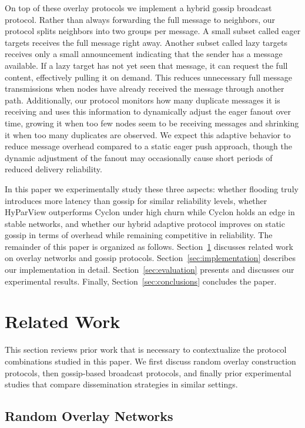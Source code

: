 \documentclass[sigconf,a4paper]{acmart}
\begin{document}
On top of these overlay protocols we implement a hybrid gossip broadcast
protocol. Rather than always forwarding the full message to neighbors, our
protocol splits neighbors into two groups per message. A small subset called
eager targets receives the full message right away. Another subset called
lazy targets receives only a small announcement indicating that the sender
has a message available. If a lazy target has not yet seen that message, it
can request the full content, effectively pulling it on demand. This reduces
unnecessary full message transmissions when nodes have already received the
message through another path. Additionally, our protocol monitors how many
duplicate messages it is receiving and uses this information to dynamically
adjust the eager fanout over time, growing it when too few nodes seem to be
receiving messages and shrinking it when too many duplicates are observed.
We expect this adaptive behavior to reduce message overhead compared to a
static eager push approach, though the dynamic adjustment of the fanout may
occasionally cause short periods of reduced delivery reliability.

In this paper we experimentally study these three aspects: whether flooding
truly introduces more latency than gossip for similar reliability levels,
whether HyParView outperforms Cyclon under high churn while Cyclon holds
an edge in stable networks, and whether our hybrid adaptive protocol
improves on static gossip in terms of overhead while remaining competitive
in reliability. The remainder of this paper is organized as follows.
Section~\ref{sec:related} discusses related work on overlay networks and
gossip protocols. Section~\ref{sec:implementation} describes our
implementation in detail. Section~\ref{sec:evaluation} presents and
discusses our experimental results. Finally,
Section~\ref{sec:conclusions} concludes the paper.

\section{Related Work}
\label{sec:related}

This section reviews prior work that is necessary to contextualize the
protocol combinations studied in this paper. We first discuss random
overlay construction protocols, then gossip-based broadcast protocols,
and finally prior experimental studies that compare dissemination
strategies in similar settings.

\subsection{Random Overlay Networks}
\end{document}
